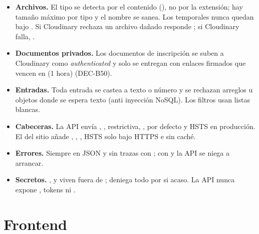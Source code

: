 \documentclass[11pt,a4paper]{article}
\begin{document}
\begin{itemize}
    JWT de 8 h que el login con contrase\~na.
  \item \textbf{Archivos.} El tipo se detecta por el contenido (), no por la extensi\'on; hay tama\~no m\'aximo
    por tipo y el nombre se sanea. Los temporales nunca quedan bajo . Si Cloudinary rechaza un archivo
    da\~nado responde ; si Cloudinary falla, .
  \item \textbf{Documentos privados.} Los documentos de inscripci\'on se suben a Cloudinary como \emph{authenticated} y
    solo se entregan con enlaces firmados que vencen en  (1 hora) (DEC-B50).
  \item \textbf{Entradas.} Toda entrada se castea a texto o n\'umero y se rechazan arreglos u objetos donde se espera
    texto (anti inyecci\'on NoSQL). Los filtros usan listas blancas.
  \item \textbf{Cabeceras.} La API env\'ia , ,
     restrictiva, ,  por
    defecto y HSTS en producci\'on. El  del sitio a\~nade , , , HSTS solo bajo HTTPS e  sin cach\'e.
  \item \textbf{Errores.} Siempre en JSON y sin trazas con ; con  y
     la API se niega a arrancar.
  \item \textbf{Secretos.} ,  y  viven fuera de ;
     deniega todo por si acaso. La API nunca expone , tokens ni .
\end{itemize}

\section{Frontend}\label{sec:front}
\end{document}
